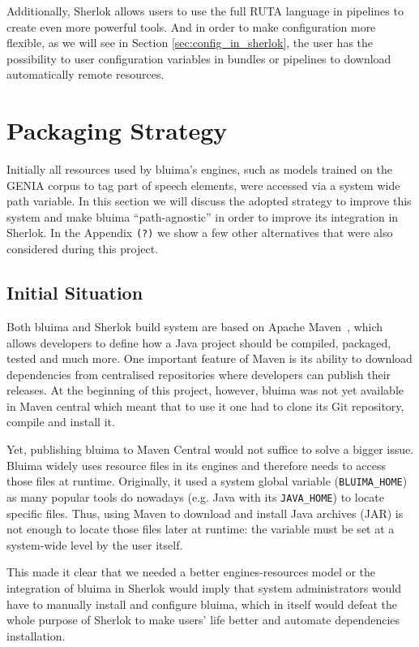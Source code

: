 \documentclass{article}
\newcommand{\VAR}[1]{\mbox{\texttt{#1}}}
\newcommand{\JAR}{JAR\xspace}
\newcommand{\TODO}[1]{\texttt{\textcolor{YellowOrange}{(#1)}}} %
\begin{document}
Additionally, Sherlok allows users to use the full RUTA language in pipelines to create even more
powerful tools. And in order to make configuration more flexible, as we will see in Section
\ref{sec:config_in_sherlok}, the user has the possibility to user configuration variables in bundles
or pipelines to download automatically remote resources.

\section{Packaging Strategy}

Initially all resources used by bluima's engines, such as models trained on the GENIA corpus
\cite{genia} to tag part of speech elements, were accessed via a system wide path variable. In this
section we will discuss the adopted strategy to improve this system and make bluima
``path-agnostic'' in order to improve its integration in Sherlok. In the Appendix \TODO{?} we show a
few other alternatives that were also considered during this project.

\subsection{Initial Situation}

Both bluima and Sherlok build system are based on Apache Maven~\cite{maven}, which allows developers
to define how a Java project should be compiled, packaged, tested and much more. One important
feature of Maven is its ability to download dependencies from centralised repositories where
developers can publish their releases. At the beginning of this project, however, bluima was not yet
available in Maven central which meant that to use it one had to clone its Git repository, compile
and install it.

Yet, publishing bluima to Maven Central would not suffice to solve a bigger issue. Bluima widely
uses resource files in its engines and therefore needs to access those files at runtime. Originally,
it used a system global variable (\VAR{BLUIMA\_HOME}) as many popular tools do nowadays (e.g. Java
with its \VAR{JAVA\_HOME}) to locate specific files. Thus, using Maven to download and install Java
archives (\JAR) is not enough to locate those files later at runtime: the variable must be set at a
system-wide level by the user itself.

This made it clear that we needed a better engines-resources model or the integration of bluima in
Sherlok would imply that system administrators would have to manually install and configure bluima,
which in itself would defeat the whole purpose of Sherlok to make users' life better and automate
dependencies installation.
\end{document}
